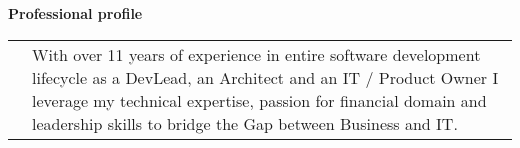 \textbf{Professional profile}
\\
\begin{tabular}{p{}|p{}}
&With over 11 years of experience in entire software development lifecycle as a DevLead, an Architect and an IT / Product Owner I leverage my technical expertise, passion for financial domain and leadership skills to bridge the Gap between Business and IT.\\
\end{tabular}